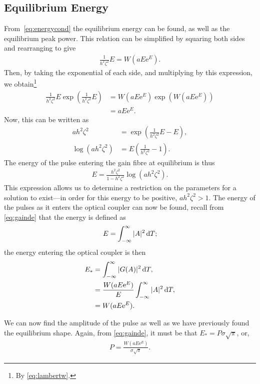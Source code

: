 \subsection{Equilibrium Energy}
From~\eqref{eq:energycond} the equilibrium energy can be found, as well as the equilibrium peak power. This relation can be simplified by squaring both sides and rearranging to give
\begin{align*}
\frac{1}{h^2 \zeta^2} E = W \left( a E \textrm{e}^E \right).
\end{align*}
Then, by taking the exponential of each side, and multiplying by this expression, we obtain\footnote{By \eqref{eq:lambertw}.}
\begin{align*}
\frac{1}{h^2 \zeta^2} E \exp \left(\frac{1}{h^2 \zeta^2} E \right) &= W \left( a E \textrm{e}^E \right) \exp \left( W \left( a E \textrm{e}^E \right) \right) \\
&= a E \textrm{e}^E.
\end{align*}
Now, this can be written as 
\begin{align*}
a h^2 \zeta^2 &= \exp \left( \frac{1}{h^2 \zeta^2}E - E \right), \\
\log \left( a h^2 \zeta^2 \right) &= E \left( \frac{1}{h^2 \zeta^2} - 1 \right).
\end{align*}
The energy of the pulse entering the gain fibre at equilibrium is thus
\begin{align*}
E = \frac{h^2 \zeta^2}{1 - h^2 \zeta^2} \log \left( a h^2 \zeta^2 \right).
\end{align*}
This expression allows us to determine a restriction on the parameters for a solution to exist---in order for this energy to be positive, $a h^2 \zeta^2 > 1$. The energy of the pulses as it enters the optical coupler can now be found, recall from \eqref{eq:gainde} that the energy is defined as
\begin{align*}
E = \int_{-\infty}^\infty |A|^2 \, \textrm{d} T;
\end{align*}
the energy entering the optical coupler is then
\begin{align}
\nonumber E_* &= \int_{-\infty}^\infty |G(A)|^2 \, \textrm{d} T, \\
\nonumber &= \frac{W(a E \textrm{e}^E)}{E} \int_{-\infty}^\infty |A|^2 \, \textrm{d} T, \\
&= W(a E \textrm{e}^E).
\end{align}

We can now find the amplitude of the pulse as well as we have previously found the equilibrium shape. Again, from \eqref{eq:gainde}, it must be that $E_* = P \sigma \sqrt{\pi}$, or,
\begin{align}
P = \frac{W(a E \textrm{e}^E)}{\sigma \sqrt{\pi}}.
\end{align}
